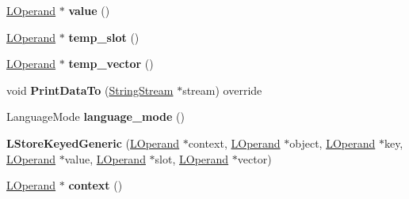 \begin{DoxyCompactItemize}
\item 
\hyperlink{classv8_1_1internal_1_1_l_operand}{L\+Operand} $\ast$ {\bfseries value} ()\hypertarget{classv8_1_1internal_1_1_l_store_keyed_generic_ae0648fd1acbfca9be9ecd39a179ebb13}{}\label{classv8_1_1internal_1_1_l_store_keyed_generic_ae0648fd1acbfca9be9ecd39a179ebb13}

\item 
\hyperlink{classv8_1_1internal_1_1_l_operand}{L\+Operand} $\ast$ {\bfseries temp\+\_\+slot} ()\hypertarget{classv8_1_1internal_1_1_l_store_keyed_generic_a2badce4286c0f26664dbddd0e2b29846}{}\label{classv8_1_1internal_1_1_l_store_keyed_generic_a2badce4286c0f26664dbddd0e2b29846}

\item 
\hyperlink{classv8_1_1internal_1_1_l_operand}{L\+Operand} $\ast$ {\bfseries temp\+\_\+vector} ()\hypertarget{classv8_1_1internal_1_1_l_store_keyed_generic_a8e332b61e68443ed2a912b79cbf01438}{}\label{classv8_1_1internal_1_1_l_store_keyed_generic_a8e332b61e68443ed2a912b79cbf01438}

\item 
void {\bfseries Print\+Data\+To} (\hyperlink{classv8_1_1internal_1_1_string_stream}{String\+Stream} $\ast$stream) override\hypertarget{classv8_1_1internal_1_1_l_store_keyed_generic_ab0d8e8441ce3f1b71da8ce0ccf807df8}{}\label{classv8_1_1internal_1_1_l_store_keyed_generic_ab0d8e8441ce3f1b71da8ce0ccf807df8}

\item 
Language\+Mode {\bfseries language\+\_\+mode} ()\hypertarget{classv8_1_1internal_1_1_l_store_keyed_generic_a279b2804fdca1b8181ce7a4b2e7a0d88}{}\label{classv8_1_1internal_1_1_l_store_keyed_generic_a279b2804fdca1b8181ce7a4b2e7a0d88}

\item 
{\bfseries L\+Store\+Keyed\+Generic} (\hyperlink{classv8_1_1internal_1_1_l_operand}{L\+Operand} $\ast$context, \hyperlink{classv8_1_1internal_1_1_l_operand}{L\+Operand} $\ast$object, \hyperlink{classv8_1_1internal_1_1_l_operand}{L\+Operand} $\ast$key, \hyperlink{classv8_1_1internal_1_1_l_operand}{L\+Operand} $\ast$value, \hyperlink{classv8_1_1internal_1_1_l_operand}{L\+Operand} $\ast$slot, \hyperlink{classv8_1_1internal_1_1_l_operand}{L\+Operand} $\ast$vector)\hypertarget{classv8_1_1internal_1_1_l_store_keyed_generic_af091880976ae47ab5668f689b739343e}{}\label{classv8_1_1internal_1_1_l_store_keyed_generic_af091880976ae47ab5668f689b739343e}

\item 
\hyperlink{classv8_1_1internal_1_1_l_operand}{L\+Operand} $\ast$ {\bfseries context} ()\hypertarget{classv8_1_1internal_1_1_l_store_keyed_generic_a4f167d2748fbfa19937cabab260ea080}{}\label{classv8_1_1internal_1_1_l_store_keyed_generic_a4f167d2748fbfa19937cabab260ea080}


\end{DoxyCompactItemize}
